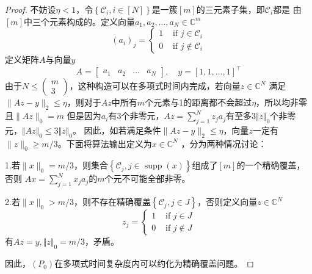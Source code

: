 \begin{proof}
    不妨设$\eta <1$，令$\left\{\mathcal{C}_i, i \in[N]\right\}$是一簇$[m]$的三元素子集，即$\mathcal{C}_i$都是
    由$[m]$中三个元素构成的。定义向量$a_1, a_2, \ldots, a_N \in \mathbb{C}^m$
    \begin{equation}
        \left(a_i\right)_j= \begin{cases}1 & \text { if } j \in \mathcal{C}_i \\ 0 & \text { if } j \notin \mathcal{C}_i\end{cases}
    \end{equation}
    定义矩阵$A$与向量$y$
    \begin{equation}
        A=\left[\begin{array}{l|l|l|l}
        a_1 & a_2 & \ldots & a_N
        \end{array}\right], \quad y=[1,1, \ldots, 1]^{\top}
    \end{equation}
由于$N \leq\left(\begin{array}{c}m \\ 3\end{array}\right)$，这种构造可以在多项式时间内完成，若向量$z\in \mathbb{C}^N$
满足$\|A z-y\|_2 \leq \eta$，则对于$Az$中所有$m$个元素与1的距离都不会超过$\eta$，所以均非零且$\|A z\|_0=m$
但是因为$a_i$有3个非零元，$A z=\sum_{j=1}^N z_j a_j$有至多$3\Vert z\Vert_0$个非零元，$\Vert Az\Vert_0\le 3\Vert z\Vert _0$。
因此，如若满足条件$\|A z-y\|_2 \leq \eta$，向量$z$一定有$\|z\|_0 \geq m / 3$。下面将算法输出定义为$x\in \mathbb{C}^N$
，分为两种情况讨论：\par
1.若$\|x\|_0=m / 3$，则集合$\left\{\mathcal{C}_j, j \in \operatorname{supp}(x)\right\}$组成了$[m]$的一个精确覆盖，否则
$A x=\sum_{j=1}^N x_j a_j$的$m$个元不可能全部非零。\par
2.若$\|x\|_0>m / 3$，则不存在精确覆盖$\left\{\mathcal{C}_j, j \in J\right\}$，否则定义向量$z\in \mathbb{C}^N$
\begin{equation*}
    z_j= \begin{cases}1 & \text { if } j \in J \\ 0 & \text { if } j \notin J\end{cases}
\end{equation*}
有$Az=y,\Vert z\Vert_0=m/3$，矛盾。\par
因此，$(P_0)$在多项式时间复杂度内可以约化为精确覆盖问题。
\end{proof}
